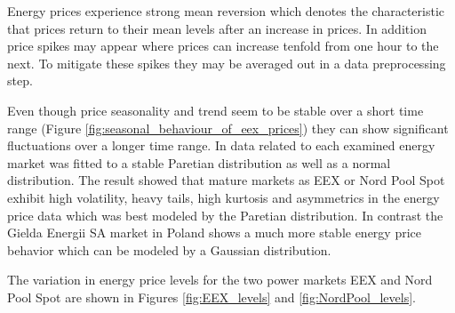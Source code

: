 Energy prices experience strong mean reversion which denotes the characteristic that prices return to their mean levels after an increase in prices. In addition price spikes may appear where prices can increase tenfold from one hour to the next. To mitigate these spikes they may be averaged out in a data preprocessing step. 

Even though price seasonality and trend seem to be stable over a short time range (Figure \ref{fig:seasonal_behaviour_of_eex_prices}) they can show significant fluctuations over a longer time range. In \cite{mugele2005stable} data related to each examined energy market was fitted to a stable Paretian distribution as well as a normal distribution. The result showed that mature markets as EEX or Nord Pool Spot exhibit high volatility, heavy tails, high kurtosis and asymmetrics in the energy price data which was best modeled by the Paretian distribution. In contrast the Gielda Energii SA market in Poland shows a much more stable energy price behavior which can be modeled by a Gaussian distribution. 

The variation in energy price levels for the two power markets EEX and Nord Pool Spot are shown in Figures \ref{fig:EEX_levels} and \ref{fig:NordPool_levels}.

